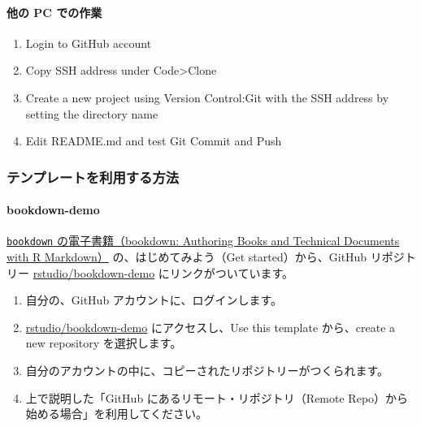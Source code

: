 \documentclass[
  xelatex, ja=standard]{bxjsbook}
\providecommand{\tightlist}{%
  \setlength{\itemsep}{0pt}\setlength{\parskip}{0pt}}
\theoremstyle{definition}
\theoremstyle{definition}
\theoremstyle{definition}
\theoremstyle{definition}
\theoremstyle{remark}
\begin{document}
\hypertarget{ux4ed6ux306e-pc-ux3067ux306eux4f5cux696d}{%
\paragraph{他の PC での作業}\label{ux4ed6ux306e-pc-ux3067ux306eux4f5cux696d}}

\begin{enumerate}
\def\labelenumi{\arabic{enumi}.}
\tightlist
\item
  Login to GitHub account
\item
  Copy SSH address under Code\textgreater Clone
\item
  Create a new project using Version Control:Git with the SSH address by setting the directory name
\item
  Edit README.md and test Git Commit and Push
\end{enumerate}

\hypertarget{ux30c6ux30f3ux30d7ux30ecux30fcux30c8ux3092ux5229ux7528ux3059ux308bux65b9ux6cd5}{%
\subsubsection{テンプレートを利用する方法}\label{ux30c6ux30f3ux30d7ux30ecux30fcux30c8ux3092ux5229ux7528ux3059ux308bux65b9ux6cd5}}

\hypertarget{bookdown-demo}{%
\paragraph{bookdown-demo}\label{bookdown-demo}}

\href{https://bookdown.org/yihui/bookdown/}{\texttt{bookdown} の電子書籍（bookdown: Authoring Books and Technical Documents with R Markdown）} の、はじめてみよう（Get started）から、GitHub リポジトリー \href{https://github.com/rstudio/bookdown-demo}{rstudio/bookdown-demo} にリンクがついています。

\begin{enumerate}
\def\labelenumi{\arabic{enumi}.}
\tightlist
\item
  自分の、GitHub アカウントに、ログインします。
\item
  \href{https://github.com/rstudio/bookdown-demo}{rstudio/bookdown-demo} にアクセスし、Use this template から、create a new repository を選択します。
\item
  自分のアカウントの中に、コピーされたリポジトリーがつくられます。
\item
  上で説明した「GitHub にあるリモート・リポジトリ（Remote Repo）から始める場合」を利用してください。
\end{enumerate}
\end{document}

